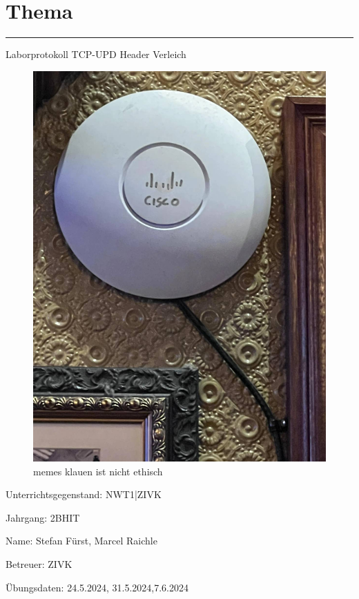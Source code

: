 \documentclass[a4paper]{article}
\begin{document}

\pagestyle{oida}
\section*{Thema}
\par\noindent\rule{\textwidth}{0.4pt}

Laborprotokoll
TCP-UPD Header Verleich

\begin{figure}[h]
	\includegraphics[scale=0.3]{images/meme.jpeg}
	\caption{memes klauen ist nicht ethisch}
\end{figure}

\vspace*{\fill}
Unterrichtsgegenstand:	NWT1|ZIVK

Jahrgang:	2BHIT

Name:	Stefan Fürst, Marcel Raichle

Betreuer: 	ZIVK

Übungsdaten:	24.5.2024, 31.5.2024,7.6.2024
\end{document}
